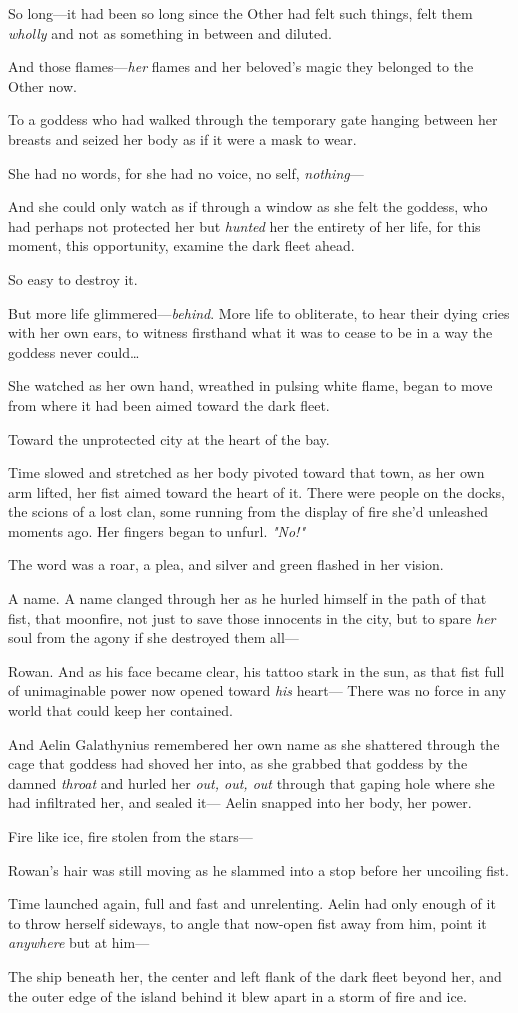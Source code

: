 So long---it had been so long since the Other had felt such things, felt them \emph{wholly} and not as something in between and diluted.

And those flames---\emph{her} flames and her beloved's magic 
they belonged to the Other now.

To a goddess who had walked through the temporary gate hanging between her breasts and seized her body as if it were a mask to wear.

She had no words, for she had no voice, no self, \emph{nothing}---

And she could only watch as if through a window as she felt the goddess, who had perhaps not protected her but \emph{hunted} her the entirety of her life, for this moment, this opportunity, examine the dark fleet ahead.

So easy to destroy it.

But more life glimmered---\emph{behind}. More life to obliterate, to hear their dying cries with her own ears, to witness firsthand what it was to cease to be in a way the goddess never could\ldots{}

She watched as her own hand, wreathed in pulsing white flame, began to move from where it had been aimed toward the dark fleet.

Toward the unprotected city at the heart of the bay.

Time slowed and stretched as her body pivoted toward that town, as her own arm lifted, her fist aimed toward the heart of it. There were people on the docks, the scions of a lost clan, some running from the display of fire she'd unleashed moments ago. Her fingers began to unfurl.
\emph{"No!"}

The word was a roar, a plea, and silver and green flashed in her vision.

A name. A name clanged through her as he hurled himself in the path of that fist, that moonfire, not just to save those innocents in the city, but to spare \emph{her} soul from the agony if she destroyed them all---

Rowan. And as his face became clear, his tattoo stark in the sun, as that fist full of unimaginable power now opened toward \emph{his}
heart--- There was no force in any world that could keep her contained.

And Aelin Galathynius remembered her own name as she shattered through the cage that goddess had shoved her into, as she grabbed that goddess by the damned \emph{throat} and hurled her \emph{out, out, out} through that gaping hole where she had infiltrated her, and sealed it--- Aelin snapped into her body, her power.

Fire like ice, fire stolen from the stars---

Rowan's hair was still moving as he slammed into a stop before her uncoiling fist.

Time launched again, full and fast and unrelenting. Aelin had only enough of it to throw herself sideways, to angle that now-open fist away from him, point it \emph{anywhere} but at him---

The ship beneath her, the center and left flank of the dark fleet beyond her, and the outer edge of the island behind it blew apart in a storm of fire and ice.
